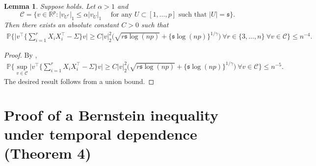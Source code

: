 \documentclass[11pt]{article}
\newcommand{\s}{ { \mathfrak{s}  } }
\newcommand{\p}{\mathbb P}
\theoremstyle{plain}
\newtheorem{lemma}[theorem]{Lemma}
\theoremstyle{definition}
\begin{document}
 
 \begin{lemma}  \label{lemma:RES Version II} 
Suppose     holds. Let $\alpha >1$ and 
$$ \mathcal C = \{ v \in \mathbb R^p :  | v_{U^c}   |_1 \le  \alpha    | v_{U  } |_1 \quad \text{ for any }  U\subset [1,\ldots,p] \text{ such that } |U|  =  \s   \} . $$ 
Then there exists an absolute constant $C > 0$ such that 
\begin{align*}
 \p\bigg\{    \bigg| v^\top  \bigg\{  \sum_{i=1}^r X_iX_i^\top  -\Sigma\bigg \} v\bigg|        \ge   C  |v|_2^2   \bigg( \sqrt {  r \s\log(np) }  +  \{  \s \log(np) \} ^{1/\gamma }  \bigg)   \ 
 \forall  r \in\{3, \ldots, n\}  \ \forall v\in\mathcal C  \bigg\}    \le n^{-4}.
\end{align*}  
 
\end{lemma} 
 \begin{proof}
 By , 
 \begin{align*}
 \p\bigg\{  \sup_{ v\in \mathcal C  } \bigg| v^\top  \bigg\{  \sum_{i=1}^r X_iX_i^\top  -\Sigma\bigg \} v\bigg|        \ge   C  |v|_2^2   \bigg( \sqrt {  r \s\log(np) }  +  \{  \s \log(np) \} ^{1/\gamma }    \bigg)  \ \forall v\in\mathcal C     \bigg\}    \le n^{-5}.
\end{align*}    
The desired result follows from a union bound. 
 \end{proof}
 
 
\section{Proof of a Bernstein inequality under temporal dependence (Theorem 4)}\label{sec-proof-th4}
\end{document}
